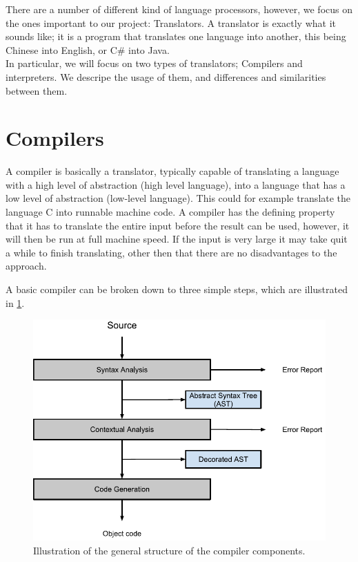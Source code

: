 There are a number of different kind of language processors, however, we focus on the ones important to our project: Translators. A translator is exactly what it sounds like; it is a program that translates one language into another, this being Chinese into English, or C\# into Java. \\ \indent 
   In particular, we will focus on two types of translators; Compilers and interpreters. We descripe the usage of them, and differences and similarities between them.

\section{Compilers}
A compiler is basically a translator, typically capable of translating a language with a high level of abstraction (high level language), into a language that has a low level of abstraction (low-level language). This could for example translate the language C into runnable machine code. A compiler has the defining property that it has to translate the entire input before the result can be used, however, it will then be run at full machine speed. If the input is very large it may take quit a while to finish translating, other then that there are no disadvantages to the approach.\\ \indent

A basic compiler can be broken down to three simple steps, which are illustrated in \ref{fig:compiler}.

\begin{figure}[H]
\begin{center}
\includegraphics[scale=0.5]{Images/compiler_drawing.png}
\end{center}
\caption{Illustration of the general structure of the compiler components.}
\label{fig:compiler}
\end{figure}



